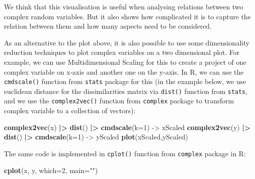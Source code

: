 \documentclass[
]{book}
\newenvironment{Shaded}{\begin{snugshade}}{\end{snugshade}}
\newcommand{\DataTypeTok}[1]{\textcolor[rgb]{0.13,0.29,0.53}{#1}}
\newcommand{\DecValTok}[1]{\textcolor[rgb]{0.00,0.00,0.81}{#1}}
\newcommand{\ErrorTok}[1]{\textcolor[rgb]{0.64,0.00,0.00}{\textbf{#1}}}
\newcommand{\KeywordTok}[1]{\textcolor[rgb]{0.13,0.29,0.53}{\textbf{#1}}}
\newcommand{\NormalTok}[1]{#1}
\newcommand{\OperatorTok}[1]{\textcolor[rgb]{0.81,0.36,0.00}{\textbf{#1}}}
\newcommand{\StringTok}[1]{\textcolor[rgb]{0.31,0.60,0.02}{#1}}
\begin{document}
We think that this visualisation is useful when analysing relations between two complex random variables. But it also shows how complicated it is to capture the relation between them and how many aspects need to be considered.

As an alternative to the plot above, it is also possible to use some dimensionality reduction techniques to plot complex variables on a two dimensional plot. For example, we can use Multidimensional Scaling for this \citep[MDS,][]{refMDS} to create a project of one complex variable on x-axis and another one on the y-axis. In R, we can use the \texttt{cmdscale()} function from \texttt{stats} package for this (in the example below, we use euclidean distance for the dissimilarities matrix via \texttt{dist()} function from \texttt{stats}, and we use the \texttt{complex2vec()} function from \texttt{complex} package to transform complex variable to a collection of vectors):

\begin{Shaded}
\begin{Highlighting}[]
\KeywordTok{complex2vec}\NormalTok{(x) }\OperatorTok{|}\ErrorTok{\textgreater{}}\StringTok{ }\KeywordTok{dist}\NormalTok{() }\OperatorTok{|}\ErrorTok{\textgreater{}}\StringTok{ }\KeywordTok{cmdscale}\NormalTok{(}\DataTypeTok{k=}\DecValTok{1}\NormalTok{) {-}\textgreater{}}\StringTok{ }\NormalTok{xScaled}
\KeywordTok{complex2vec}\NormalTok{(y) }\OperatorTok{|}\ErrorTok{\textgreater{}}\StringTok{ }\KeywordTok{dist}\NormalTok{() }\OperatorTok{|}\ErrorTok{\textgreater{}}\StringTok{ }\KeywordTok{cmdscale}\NormalTok{(}\DataTypeTok{k=}\DecValTok{1}\NormalTok{) {-}\textgreater{}}\StringTok{ }\NormalTok{yScaled}
\KeywordTok{plot}\NormalTok{(xScaled,yScaled)}
\end{Highlighting}
\end{Shaded}

The same code is implemented in \texttt{cplot()} function from \texttt{complex} package in R:

\begin{Shaded}
\begin{Highlighting}[]
\KeywordTok{cplot}\NormalTok{(x, y, }\DataTypeTok{which=}\DecValTok{2}\NormalTok{, }\DataTypeTok{main=}\StringTok{""}\NormalTok{)}
\end{Highlighting}
\end{Shaded}
\end{document}
